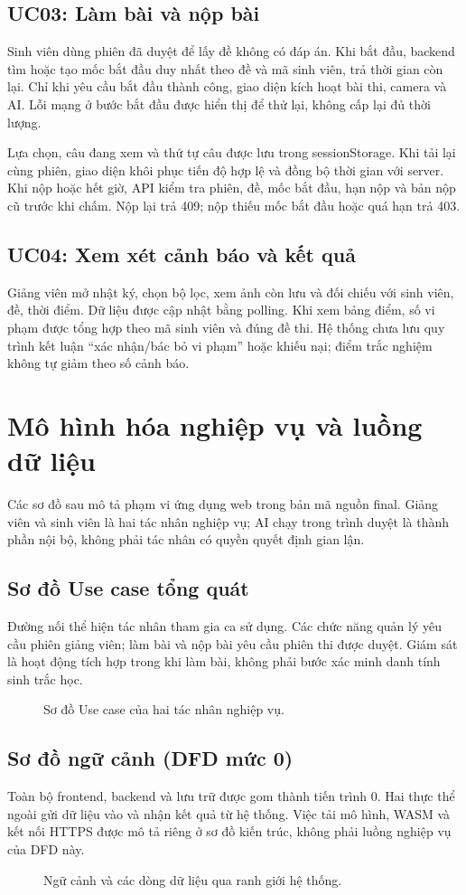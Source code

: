 \subsection{UC03: Làm bài và nộp bài}
Sinh viên dùng phiên đã duyệt để lấy đề không có đáp án. Khi bắt đầu, backend tìm hoặc tạo mốc bắt đầu duy nhất theo đề và mã sinh viên, trả thời gian còn lại. Chỉ khi yêu cầu bắt đầu thành công, giao diện kích hoạt bài thi, camera và AI. Lỗi mạng ở bước bắt đầu được hiển thị để thử lại, không cấp lại đủ thời lượng.

Lựa chọn, câu đang xem và thứ tự câu được lưu trong sessionStorage. Khi tải lại cùng phiên, giao diện khôi phục tiến độ hợp lệ và đồng bộ thời gian với server. Khi nộp hoặc hết giờ, API kiểm tra phiên, đề, mốc bắt đầu, hạn nộp và bản nộp cũ trước khi chấm. Nộp lại trả 409; nộp thiếu mốc bắt đầu hoặc quá hạn trả 403.

\subsection{UC04: Xem xét cảnh báo và kết quả}
Giảng viên mở nhật ký, chọn bộ lọc, xem ảnh còn lưu và đối chiếu với sinh viên, đề, thời điểm. Dữ liệu được cập nhật bằng polling. Khi xem bảng điểm, số vi phạm được tổng hợp theo mã sinh viên và đúng đề thi. Hệ thống chưa lưu quy trình kết luận ``xác nhận/bác bỏ vi phạm'' hoặc khiếu nại; điểm trắc nghiệm không tự giảm theo số cảnh báo.

\section{Mô hình hóa nghiệp vụ và luồng dữ liệu}
Các sơ đồ sau mô tả phạm vi ứng dụng web trong bản mã nguồn final. Giảng viên và sinh viên là hai tác nhân nghiệp vụ; AI chạy trong trình duyệt là thành phần nội bộ, không phải tác nhân có quyền quyết định gian lận.
\clearpage
\subsection{Sơ đồ Use case tổng quát}
Đường nối thể hiện tác nhân tham gia ca sử dụng. Các chức năng quản lý yêu cầu phiên giảng viên; làm bài và nộp bài yêu cầu phiên thi được duyệt. Giám sát là hoạt động tích hợp trong khi làm bài, không phải bước xác minh danh tính sinh trắc học.
\begin{figure}[H]\centering
\caption{Sơ đồ Use case của hai tác nhân nghiệp vụ.}\end{figure}
\clearpage
\subsection{Sơ đồ ngữ cảnh (DFD mức 0)}
Toàn bộ frontend, backend và lưu trữ được gom thành tiến trình 0. Hai thực thể ngoài gửi dữ liệu vào và nhận kết quả từ hệ thống. Việc tải mô hình, WASM và kết nối HTTPS được mô tả riêng ở sơ đồ kiến trúc, không phải luồng nghiệp vụ của DFD này.
\begin{figure}[H]\centering
\caption{Ngữ cảnh và các dòng dữ liệu qua ranh giới hệ thống.}\end{figure}
\clearpage
